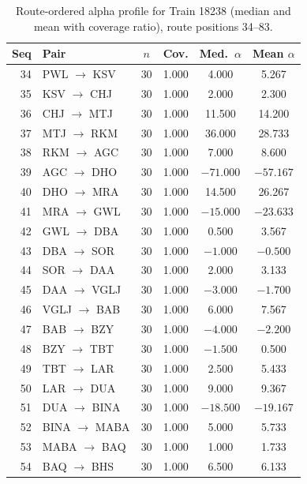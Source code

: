\documentclass[a4paper,fleqn]{cas-dc}
\begin{document}
\begingroup
\makeatletter
\addtocounter{table}{-1}
\renewcommand{\thetable}{8 (continued)}
\makeatother
\begin{table}[width=\textwidth,pos=t]
\caption{Route-ordered alpha profile for Train 18238 (median and mean with
coverage ratio), route positions 34--83.}
\setlength{\tabcolsep}{4pt}
\renewcommand{\arraystretch}{0.85}
\footnotesize
\begin{tabular*}{\tblwidth}{@{\extracolsep{\fill}}r l c c c c@{}}
\toprule
Seq & Pair & $n$ & Cov. & Med.\ $\alpha$ & Mean $\alpha$ \\
\midrule
34 & PWL $\to$ KSV & 30 & 1.000 &   4.000 &   5.267 \\
35 & KSV $\to$ CHJ & 30 & 1.000 &   2.000 &   2.300 \\
36 & CHJ $\to$ MTJ & 30 & 1.000 &  11.500 &  14.200 \\
37 & MTJ $\to$ RKM & 30 & 1.000 &  36.000 &  28.733 \\
38 & RKM $\to$ AGC & 30 & 1.000 &   7.000 &   8.600 \\
39 & AGC $\to$ DHO & 30 & 1.000 & $-71.000$ & $-57.167$ \\
40 & DHO $\to$ MRA & 30 & 1.000 &  14.500 &  26.267 \\
41 & MRA $\to$ GWL & 30 & 1.000 & $-15.000$ & $-23.633$ \\
42 & GWL $\to$ DBA & 30 & 1.000 &   0.500 &   3.567 \\
43 & DBA $\to$ SOR & 30 & 1.000 &  $-1.000$ &  $-0.500$ \\
44 & SOR $\to$ DAA & 30 & 1.000 &   2.000 &   3.133 \\
45 & DAA $\to$ VGLJ & 30 & 1.000 &  $-3.000$ &  $-1.700$ \\
46 & VGLJ $\to$ BAB & 30 & 1.000 &   6.000 &   7.567 \\
47 & BAB $\to$ BZY & 30 & 1.000 &  $-4.000$ &  $-2.200$ \\
48 & BZY $\to$ TBT & 30 & 1.000 &  $-1.500$ &   0.500 \\
49 & TBT $\to$ LAR & 30 & 1.000 &   2.500 &   5.433 \\
50 & LAR $\to$ DUA & 30 & 1.000 &   9.000 &   9.367 \\
51 & DUA $\to$ BINA & 30 & 1.000 & $-18.500$ & $-19.167$ \\
52 & BINA $\to$ MABA & 30 & 1.000 &   5.000 &   5.733 \\
53 & MABA $\to$ BAQ & 30 & 1.000 &   1.000 &   1.733 \\
54 & BAQ $\to$ BHS & 30 & 1.000 &   6.500 &   6.133 \\

\end{tabular*}
\end{table}
\end{document}
